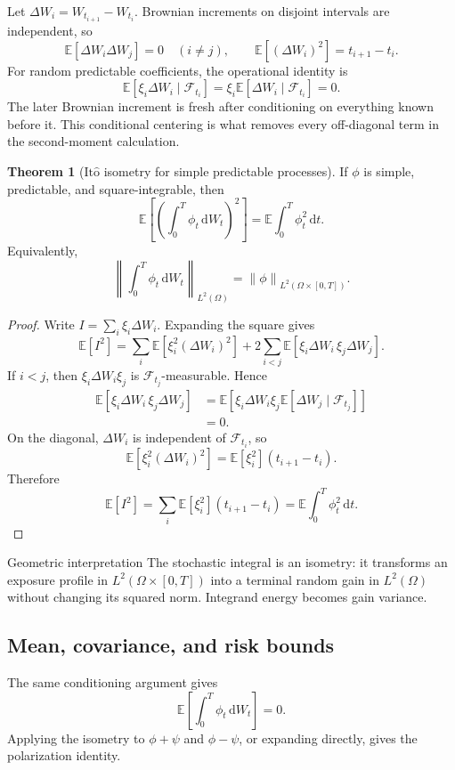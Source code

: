 \documentclass[10pt]{article}
\newcommand{\E}{\mathbb E}
\newcommand{\1}{\mathbf 1}
\newcommand{\cF}{\mathcal F}
\newcommand{\dd}{\,\mathrm d}
\newcommand{\Ito}{\mathrm{It\hat{o}}}
\newcommand{\norm}[1]{\left\lVert #1\right\rVert}
\theoremstyle{definition}
\newtheorem{theorem}[definition]{Theorem}
\begin{document}
Let \(\Delta W_i=W_{t_{i+1}}-W_{t_i}\). Brownian increments on disjoint
intervals are independent, so
\[
\E[\Delta W_i\Delta W_j]=0\quad(i\neq j),
\qquad
\E[(\Delta W_i)^2]=t_{i+1}-t_i.
\]
For random predictable coefficients, the operational identity is
\[
\E[\xi_i\Delta W_i\mid\cF_{t_i}]
=\xi_i\E[\Delta W_i\mid\cF_{t_i}]=0.
\]
The later Brownian increment is fresh after conditioning on everything known
before it. This conditional centering is what removes every off-diagonal term
in the second-moment calculation.

\begin{theorem}[\(\Ito\) isometry for simple predictable processes]
If \(\phi\) is simple, predictable, and square-integrable, then
\[
\boxed{
\E\left[\left(\int_0^T\phi_t\dd W_t\right)^2\right]
=\E\int_0^T\phi_t^2\dd t.}
\]
Equivalently,
\[
\norm{\int_0^T\phi_t\dd W_t}_{L^2(\Omega)}
=\norm{\phi}_{L^2(\Omega\times[0,T])}.
\]
\end{theorem}

\begin{proof}
Write \(I=\sum_i\xi_i\Delta W_i\). Expanding the square gives
\[
\E[I^2]
=\sum_i\E[\xi_i^2(\Delta W_i)^2]
+2\sum_{i<j}\E[\xi_i\Delta W_i\,\xi_j\Delta W_j].
\]
If \(i<j\), then \(\xi_i\Delta W_i\xi_j\) is
\(\cF_{t_j}\)-measurable. Hence
\begin{align*}
\E[\xi_i\Delta W_i\,\xi_j\Delta W_j]
&=\E\!\left[
\xi_i\Delta W_i\xi_j
\E[\Delta W_j\mid\cF_{t_j}]
\right]\\
&=0.
\end{align*}
On the diagonal, \(\Delta W_i\) is independent of \(\cF_{t_i}\), so
\[
\E[\xi_i^2(\Delta W_i)^2]
=\E[\xi_i^2](t_{i+1}-t_i).
\]
Therefore
\[
\E[I^2]
=\sum_i\E[\xi_i^2](t_{i+1}-t_i)
=\E\int_0^T\phi_t^2\dd t.
\]
\end{proof}

\begin{keyidea}{Geometric interpretation}
The stochastic integral is an isometry: it transforms an exposure profile in
\(L^2(\Omega\times[0,T])\) into a terminal random gain in \(L^2(\Omega)\)
without changing its squared norm. Integrand energy becomes gain variance.
\end{keyidea}

\subsection{Mean, covariance, and risk bounds}

The same conditioning argument gives
\[
\E\left[\int_0^T\phi_t\dd W_t\right]=0.
\]
Applying the isometry to \(\phi+\psi\) and \(\phi-\psi\), or expanding
directly, gives the polarization identity.
\end{document}
